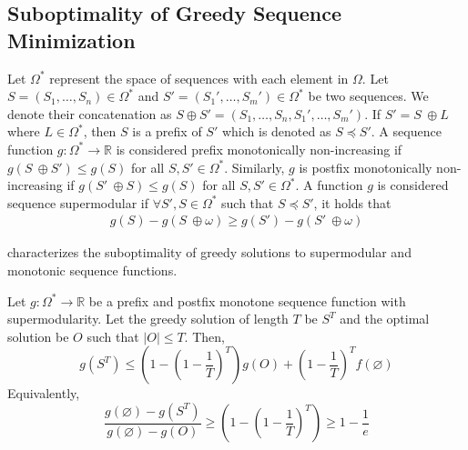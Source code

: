 \documentclass[12pt]{article}
\begin{document}


\subsection{Suboptimality of Greedy Sequence Minimization}

Let $\Omega^*$ represent the space of sequences with each element in $\Omega$. Let $S = (S_1, \dots, S_n) \in \Omega^*$ and $S' = (S_1', \dots, S_m') \in \Omega^*$ be two sequences. We denote their concatenation as $S \oplus S' = (S_1, \dots, S_n, S_1', \dots, S_m')$. If $S' = S \ \oplus L$ where $L \in \Omega^*$, then $S$ is a prefix of $S'$ which is denoted as $S \preceq S'$. A sequence function $g: \Omega^* \to \mathbb{R}$ is considered prefix monotonically non-increasing if $g(S \ \oplus S') \leq g(S)$ for all $S, S' \in \Omega^*$. Similarly, $g$ is postfix monotonically non-increasing if $g(S' \ \oplus S) \leq g(S)$ for all $S, S' \in \Omega^*$. A function $g$ is considered sequence supermodular if $\forall S', S \in \Omega^*$ such that $S \preceq S'$, it holds that
\begin{align*}
    g(S) - g(S \ \oplus \omega ) \geq g(S') - g(S' \ \oplus \omega )
\end{align*}

 characterizes the suboptimality of greedy solutions to supermodular and monotonic sequence functions. 

\begin{theorem} \label{th:suboptgreedy}
    Let $g: \Omega^* \to \mathbb{R}$ be a prefix and postfix monotone sequence function with supermodularity. Let the greedy solution of length $T$ be $S^T$ and the optimal solution be $O$ such that $|O| \leq T$. Then,
    \begin{equation*}
        g(S^T) \leq \left(1 - \left(1 - \frac{1}{T}\right)^T\right)
        g(O) +  \left(1 - \frac{1}{T}\right)^Tf(\varnothing)
    \end{equation*}
    Equivalently, 
    \begin{equation*}
        \frac{g(\varnothing) - g(S^T)}{g(\varnothing) - g(O)} \geq \left(1 - \left(1 - \frac{1}{T}\right)^T\right) \geq 1 - \frac{1}{e}
    \end{equation*}
\end{theorem}
\end{document}
